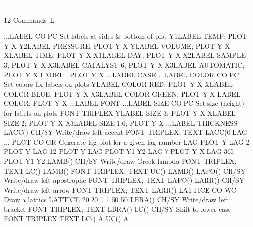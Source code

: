 ----------------------------------------
 
12
Commands--L
 
...LABEL                    CO-PC Set labels at sides & bottom of plot
                                  Y1LABEL TEMP; PLOT Y X
                                  Y2LABEL PRESSURE; PLOT Y X
                                  YLABEL VOLUME; PLOT Y X
                                  XLABEL TIME; PLOT Y X
                                  X1LABEL DAY; PLOT Y X
                                  X2LABEL SAMPLE 3; PLOT Y X
                                  X3LABEL CATALYST 6; PLOT Y X
                                  X3LABEL AUTOMATIC; PLOT Y X
                                  LABEL ; PLOT Y X
...LABEL CASE
...LABEL COLOR              CO-PC Set colors for labels on plots
                                  YLABEL COLOR RED; PLOT Y X
                                  XLABEL COLOR BLUE; PLOT Y X
                                  X3LABEL COLOR GREEN; PLOT Y X
                                  LABEL COLOR; PLOT Y X
...LABEL FONT
...LABEL SIZE               CO-PC Set size (height) for labels on plots
                                  FONT TRIPLEX
                                  YLABEL SIZE 3; PLOT Y X
                                  XLABEL SIZE 2; PLOT Y X
                                  X3LABEL SIZE 1.6; PLOT Y X
...LABEL THICKNESS
LACC()                      CH/SY Write/draw left accent
                                  FONT TRIPLEX; TEXT LACC(0
LAG ... PLOT                CO-GR Generate lag plot for a given lag number
                                  LAG PLOT Y
                                  LAG 2 PLOT Y
                                  LAG 12 PLOT Y
                                  LAG PLOT Y1 Y2
                                  LAG 7 PLOT Y X
                                  LAG 365 PLOT Y1 Y2
LAMB()                      CH/SY Write/draw Greek lambda
                                  FONT TRIPLEX; TEXT LC() LAMB()
                                  FONT TRIPLEX; TEXT UC() LAMB()
LAPO()                      CH/SY Write/draw left apostrophe
                                  FONT TRIPLEX; TEXT LAPO()
LARR()                      CH/SY Write/draw left arrow
                                  FONT TRIPLEX; TEXT LARR()
LATTICE                     CO-WC Draw a lattice
                                  LATTICE 20 20 1 1 50 50
LBRA()                      CH/SY Write/draw left bracket
                                  FONT TRIPLEX; TEXT LBRA()
LC()                        CH/SY Shift to lower case
                                  FONT TRIPLEX TEXT LC() A UC() A
